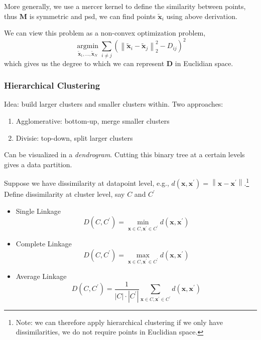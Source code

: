 \documentclass[11pt, %
	oneside, %
	english, %
	onehalfspacing, %
	parskip, %
	]{article} %
\theoremstyle{definition}
\begin{document}
More generally, we use a mercer kernel to define the similarity between points, thus $\mathbf{M}$ is symmetric and psd, we can find points $\tilde{\mathbf{x}}_i$ using above derivation.

We can view this problem as a non-convex optimization problem,
\begin{equation*}
	\underset{\tilde{\mathbf{x}}_1, \ldots, \tilde{\mathbf{x}}_N}{\operatorname{argmin}} \sum_{i \neq j}\left(\left\|\tilde{\mathbf{x}}_i-\tilde{\mathbf{x}}_j\right\|_2^2-D_{i j}\right)^2
\end{equation*}
which gives us the degree to which we can represent $\mathbf{D}$ in Euclidian space.

\subsubsection*{Hierarchical Clustering}

Idea: build larger clusters and smaller clusters within. Two approaches:
\begin{enumerate}
	\item Agglomerative: bottom-up, merge smaller clusters
	\item Divisie: top-down, split larger clusters
\end{enumerate}
Can be visualized in a \emph{dendrogram}. Cutting this binary tree at a certain levels gives a data partition.


Suppose we have dissimilarity at datapoint level, e.g., $d\left(\mathbf{x}, \mathbf{x}^{\prime}\right)=\left\|\mathbf{x}-\mathbf{x}^{\prime}\right\|$.\footnote{Note: we can therefore apply hierarchical clustering if we only have dissimilarities, we do not require points in Euclidian space.} Define dissimilarity at cluster level, say $C$ and $C^{\prime}$
\begin{itemize}
	\item Single Linkage
	$$
	D\left(C, C^{\prime}\right)=\min _{\mathbf{x} \in C, \mathbf{x}^{\prime} \in C^{\prime}} d\left(\mathbf{x}, \mathbf{x}^{\prime}\right)
	$$
	\item Complete Linkage
	$$
	D\left(C, C^{\prime}\right)=\max _{\mathbf{x} \in C, \mathbf{x}^{\prime} \in C^{\prime}} d\left(\mathbf{x}, \mathbf{x}^{\prime}\right)
	$$
	\item Average Linkage
	$$
	D\left(C, C^{\prime}\right)=\frac{1}{|C| \cdot\left|C^{\prime}\right|} \sum_{\mathbf{x} \in C, \mathbf{x}^{\prime} \in C^{\prime}} d\left(\mathbf{x}, \mathbf{x}^{\prime}\right)
	$$
\end{itemize}
\end{document}

